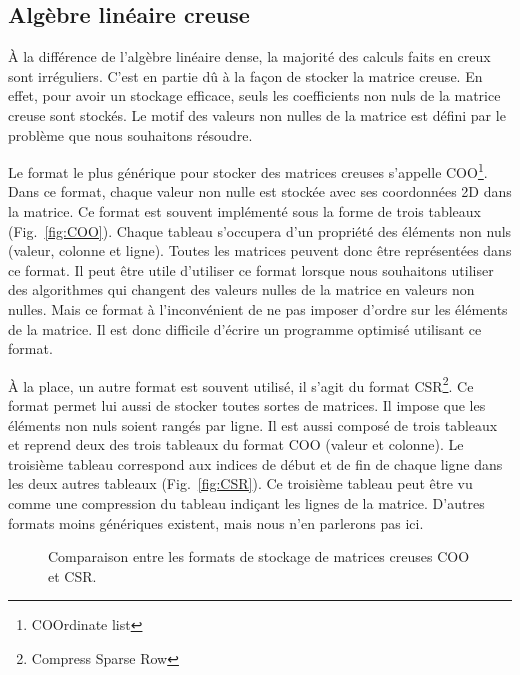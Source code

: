 \subsection{Algèbre linéaire creuse}
\`{A} la différence de l'algèbre linéaire dense, la majorité des calculs faits en creux sont irréguliers.
%
C'est en partie dû à la façon de stocker la matrice creuse.
%
En effet, pour avoir un stockage efficace, seuls les coefficients non nuls de la matrice creuse sont stockés.
%
Le motif des valeurs non nulles de la matrice est défini par le problème que nous souhaitons résoudre.


Le format le plus générique pour stocker des matrices creuses s'appelle COO\footnote{COOrdinate list}.
%
Dans ce format, chaque valeur non nulle est stockée avec ses coordonnées 2D dans la matrice.
%
Ce format est souvent implémenté sous la forme de trois tableaux (Fig.~\ref{fig:COO}).
%
Chaque tableau s'occupera d'un propriété des éléments non nuls (valeur, colonne et ligne).
%
Toutes les matrices peuvent donc être représentées dans ce format.
%
Il peut être utile d'utiliser ce format lorsque nous souhaitons utiliser des algorithmes qui changent des valeurs nulles de la matrice en valeurs non nulles.
%
Mais ce format à l'inconvénient de ne pas imposer d'ordre sur les éléments de la matrice.
%
Il est donc difficile d'écrire un programme optimisé utilisant ce format.


\`A la place, un autre format est souvent utilisé, il s'agit du format CSR\footnote{Compress Sparse Row}.
%
Ce format permet lui aussi de stocker toutes sortes de matrices.
%
Il impose que les éléments non nuls soient rangés par ligne.
%
Il est aussi composé de trois tableaux et reprend deux des trois tableaux du format COO (valeur et colonne).
%
Le troisième tableau correspond aux indices de début et de fin de chaque ligne dans les deux autres tableaux (Fig.~\ref{fig:CSR}).
%
Ce troisième tableau peut être vu comme une compression du tableau indiçant les lignes de la matrice.
%
D'autres formats moins génériques existent, mais nous n'en parlerons pas ici.

\begin{figure}[!h]
     \begin{center}
    \end{center}
    \caption{Comparaison entre les formats de stockage de matrices creuses COO et CSR.}
    \label{fig:matrix_storage}
\end{figure}


